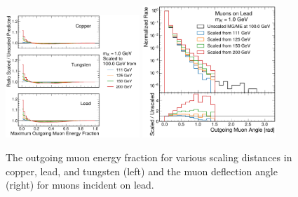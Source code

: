 \begin{figure}[!htbp]
    \centering
    \includegraphics[width=0.45\textwidth]{figures/muon_efrac_cumulative_ratio.pdf}
    \hspace{0.01\textwidth}
    \includegraphics[width=0.45\textwidth]{figures/muon_lead_ang.pdf}
    \caption[
        Validation of simulated \dbrem kinematics.
    ]{
        The outgoing muon energy fraction for various scaling distances in copper, lead, and tungsten (left) and the muon deflection angle (right) for muons incident on lead.
    }
    \label{fig:dbrem_validation}
\end{figure}